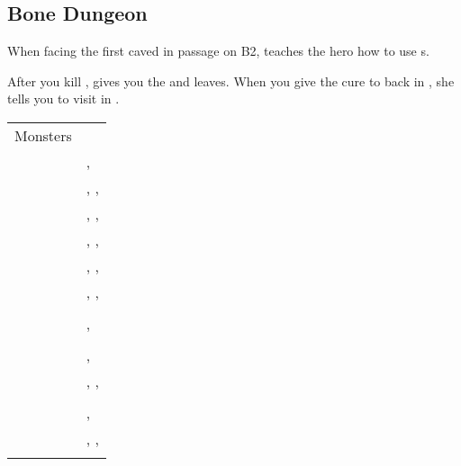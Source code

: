 \subsection{Bone Dungeon}
\label{map:bone_dungeon}

When facing the first caved in passage on B2,  teaches the hero how to use s.

After you kill ,  gives you the  and leaves. When you give the cure to  back in , she tells you to visit  in .

\begin{longtable}{ l p{9cm} }
	Monsters \\
	\nameref{monster:basilisk}
	& \nameref{monster:basilisk}, \nameref{monster:basilisk} \\
	& \nameref{monster:basilisk}, \nameref{monster:basilisk}, \nameref{monster:poison_toad} \\
	& \nameref{monster:basilisk}, \nameref{monster:basilisk}, \nameref{monster:basilisk} \\
	\nameref{monster:poison_toad}
	& \nameref{monster:poison_toad}, \nameref{monster:poison_toad}, \nameref{monster:mad_plant} \\
	& \nameref{monster:poison_toad}, \nameref{monster:poison_toad}, \nameref{monster:basilisk} \\
	& \nameref{monster:poison_toad}, \nameref{monster:poison_toad}, \nameref{monster:poison_toad} \\
	\nameref{monster:sand_worm}
	& \nameref{monster:sand_worm} \\
	& \nameref{monster:sand_worm}, \nameref{monster:sand_worm} \\
	\nameref{monster:skeleton}
	& \nameref{monster:skeleton} \\
	& \nameref{monster:skeleton}, \nameref{monster:skeleton} \\
	& \nameref{monster:skeleton}, \nameref{monster:skeleton}, \nameref{monster:skeleton} \\
	\nameref{monster:roc}
	& \nameref{monster:roc} \\
	& \nameref{monster:roc}, \nameref{monster:roc} \\
	& \nameref{monster:roc}, \nameref{monster:roc}, \nameref{monster:roc} \\
	\nameref{monster:gorgon}
	& \nameref{monster:gorgon} \\

\end{longtable}
